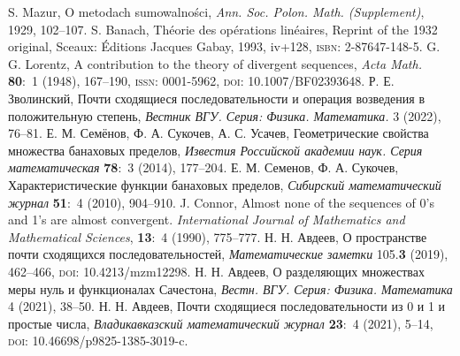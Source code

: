 \documentclass[a4paper,14pt]{article}
\begin{document}
\small
\begin{thebibliography}{99}
	{}
	S. Mazur, O metodach sumowalno\'sci,
	\emph{Ann. Soc. Polon. Math. (Supplement)}, 1929, 102--107.
	{}
	S. Banach, Th\'eorie des op\'erations lin\'eaires, Reprint of the 1932 original, Sceaux: \'Editions Jacques Gabay,
	1993, iv+128, \textsc{isbn}: 2-87647-148-5.
	{}
	G. G. Lorentz, A contribution to the theory of divergent sequences, \emph{Acta Math.} \textbf{80}:~{1}
	(1948), 167--190, \textsc{issn}: 0001-5962, \textsc{doi}: {10.1007/BF02393648}.
	{}
	Р. Е. Зволинский,
	Почти сходящиеся последовательности и операция возведения в положительную степень,
	\emph{Вестник ВГУ. Серия: Физика. Математика.} 3 (2022), 76--81.
	{}
	Е. М. Семёнов, Ф. А. Сукочев, А. С. Усачев, Геометрические свойства множества банаховых пределов,
	\emph{Известия Российской академии наук. Серия математическая} \textbf{78}:~{3} (2014), 177--204.
	{}
	Е. М. Семенов, Ф. А. Сукочев, Характеристические функции банаховых пределов, \emph{Сибирский
	математический журнал} \textbf{51}:~4 (2010), 904--910.
	{}
	J. Connor, Almost none of the sequences of 0’s and 1’s are almost
	convergent.
	\emph{International Journal of Mathematics and Mathematical Sciences}, \textbf{13}:~4 (1990), 775--777.
	{}
	Н. Н. Авдеев, О пространстве почти сходящихся последовательностей, \emph{Математические заметки}
	105.\textbf{3} (2019), 462--466, \textsc{doi}: {10.4213/mzm12298}.
	{}
	Н. Н. Авдеев, О разделяющих множествах меры нуль и функционалах Сачестона,
	\emph{Вестн. ВГУ. Серия: Физика. Математика} 4 (2021), 38--50.
	{}
	Н. Н. Авдеев, Почти сходящиеся последовательности из 0 и 1 и
	простые числа, \emph{Владикавказский математический журнал} {\bf 23}:~4 (2021), 5--14,
	\textsc{doi}: {10.46698/p9825-1385-3019-c}.
\end{thebibliography}
\normalsize
\end{document}
